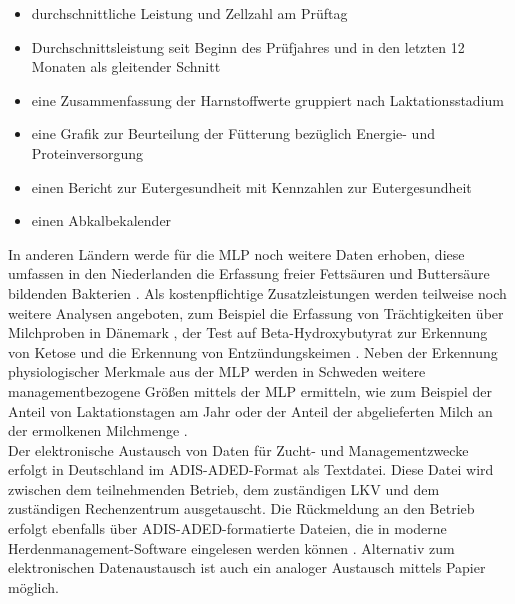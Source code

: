 \begin{itemize}
	\item durchschnittliche Leistung und Zellzahl am Prüftag \autocite{landeskontrollverband_schleswig-holstein_e.v._milchleistungsprufung_????}
	\item Durchschnittsleistung seit Beginn des Prüfjahres und in den letzten 12 Monaten als gleitender Schnitt \autocite{landeskontrollverband_schleswig-holstein_e.v._milchleistungsprufung_????}
	\item eine Zusammenfassung der Harnstoffwerte gruppiert nach Laktationsstadium \autocite{landeskontrollverband_schleswig-holstein_e.v._milchleistungsprufung_????}
	\item eine Grafik zur Beurteilung der Fütterung bezüglich Energie- und Proteinversorgung \autocite{landeskontrollverband_schleswig-holstein_e.v._milchleistungsprufung_????}
	\item einen Bericht zur Eutergesundheit mit Kennzahlen zur Eutergesundheit \autocite{landeskontrollverband_schleswig-holstein_e.v._milchleistungsprufung_????}
	\item einen Abkalbekalender \autocite{landeskontrollverband_schleswig-holstein_e.v._milchleistungsprufung_????}
\end{itemize}
In anderen Ländern werde für die MLP noch weitere Daten erhoben, diese umfassen in den Niederlanden die Erfassung freier Fettsäuren und Buttersäure bildenden Bakterien \autocite[717]{de_vries_m._exploring_2014}. Als kostenpflichtige Zusatzleistungen werden teilweise noch weitere Analysen angeboten, zum Beispiel die Erfassung von Trächtigkeiten über Milchproben in Dänemark \autocite{_pregnancy_????}, der Test auf Beta-Hydroxybutyrat zur Erkennung von Ketose \autocite{_new_????} und die Erkennung von Entzündungskeimen \autocite{_oversigt_????}.
Neben der Erkennung physiologischer Merkmale aus der MLP werden in Schweden weitere managementbezogene Größen mittels der MLP ermitteln, wie zum Beispiel der Anteil von Laktationstagen am Jahr oder der Anteil der abgelieferten Milch an der ermolkenen Milchmenge \autocite{vaxa_sverige_alla_2017}.\\
Der elektronische Austausch von Daten für Zucht- und Managementzwecke erfolgt in Deutschland im ADIS-ADED-Format als Textdatei. Diese Datei wird zwischen dem teilnehmenden Betrieb, dem zuständigen LKV und dem zuständigen Rechenzentrum ausgetauscht. Die Rückmeldung an den Betrieb erfolgt ebenfalls über ADIS-ADED-formatierte Dateien, die in moderne Herdenmanagement-Software eingelesen werden können \autocite{landeskontrollverband_schleswig-holstein_e.v._milchleistungsprufung_????}. Alternativ zum elektronischen Datenaustausch ist auch ein analoger Austausch mittels Papier möglich.

